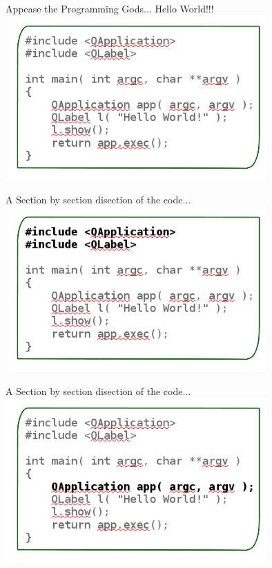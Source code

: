 \documentclass{beamer}
\begin{document}
\begin{frame}{Appease the Programming Gods...}
Hello World!!!
\includegraphics[width=10cm]{helloworld1.png}
\end{frame}

\begin{frame}
A Section by section disection of the code...
\includegraphics[width=10cm]{helloworld2.png}
\end{frame}

\begin{frame}
A Section by section disection of the code...
\includegraphics[width=10cm]{helloworld3.png}
\end{frame}
\end{document}
